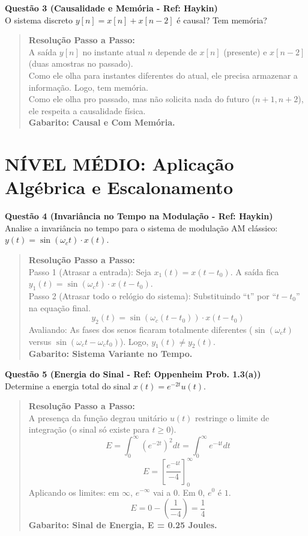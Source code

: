 \textbf{Questão 3 (Causalidade e Memória - Ref: Haykin)}\\
O sistema discreto \(y[n] = x[n] + x[n-2]\) é causal? Tem memória?

\begin{quote}
\textbf{Resolução Passo a Passo:}\\
A saída \(y[n]\) no instante atual \(n\) depende de \(x[n]\) (presente) e \(x[n-2]\) (duas amostras no passado).\\
Como ele olha para instantes diferentes do atual, ele precisa armazenar a informação. Logo, tem memória.\\
Como ele olha pro passado, mas não solicita nada do futuro (\(n+1, n+2\)), ele respeita a causalidade física.\\
\textbf{Gabarito: Causal e Com Memória.}
\end{quote}

\section{NÍVEL MÉDIO: Aplicação Algébrica e Escalonamento}\label{nuxedvel-muxe9dio-aplicauxe7uxe3o-alguxe9brica-e-escalonamento}

\textbf{Questão 4 (Invariância no Tempo na Modulação - Ref: Haykin)}\\
Analise a invariância no tempo para o sistema de modulação AM clássico: \(y(t) = \sin(\omega_c t) \cdot x(t)\).

\begin{quote}
\textbf{Resolução Passo a Passo:}\\
Passo 1 (Atrasar a entrada): Seja \(x_1(t) = x(t-t_0)\). A saída fica \(y_1(t) = \sin(\omega_c t) \cdot x(t-t_0)\).\\
Passo 2 (Atrasar todo o relógio do sistema): Substituindo ``t'' por ``\(t-t_0\)'' na equação final.
\[y_2(t) = \sin(\omega_c (t-t_0)) \cdot x(t-t_0)\]
Avaliando: As fases dos senos ficaram totalmente diferentes (\(\sin(\omega_c t)\) versus \(\sin(\omega_c t - \omega_c t_0)\)). Logo, \(y_1(t) \neq y_2(t)\).\\
\textbf{Gabarito: Sistema Variante no Tempo.}
\end{quote}

\textbf{Questão 5 (Energia do Sinal - Ref: Oppenheim Prob. 1.3(a))}\\
Determine a energia total do sinal \(x(t) = e^{-2t}u(t)\).

\begin{quote}
\textbf{Resolução Passo a Passo:}\\
A presença da função degrau unitário \(u(t)\) restringe o limite de integração (o sinal só existe para \(t \ge 0\)).
\[E = \int_{0}^{\infty} (e^{-2t})^2 dt = \int_{0}^{\infty} e^{-4t} dt\]
\[E = \left[ \frac{e^{-4t}}{-4} \right]_0^\infty\]
Aplicando os limites: em \(\infty\), \(e^{-\infty}\) vai a \(0\). Em \(0\), \(e^{0}\) é \(1\).
\[E = 0 - \left(\frac{1}{-4}\right) = \frac{1}{4}\]
\textbf{Gabarito: Sinal de Energia, E = 0.25 Joules.}
\end{quote}

